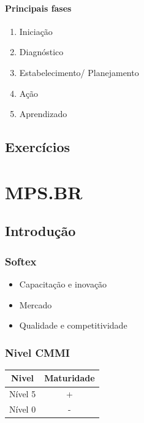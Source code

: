 \documentclass{article}
\begin{document}
\paragraph{Principais fases}
	\begin{enumerate}
	\item Iniciação
	\item Diagnóstico
	\item Estabelecimento/ Planejamento
	\item Ação
	\item Aprendizado	
	\end{enumerate}

\subsection{Exercícios}

\section{MPS.BR} 
\subsection{Introdução} \date{26 de Março de 2014}


\subsubsection{Softex} 
	\begin{itemize}
	\item Capacitação e inovação
	\item Mercado
	\item Qualidade e competitividade
	\end{itemize}
	
\subsubsection{Nivel CMMI}
	
\begin{center}

\begin{tabular}{|c|c|}
\hline 
Nivel & Maturidade \\ 
\hline 
Nível 5 & + \\ 
\hline 
Nível 0 & - \\ 
\hline 
\end{tabular} 

\end{center}
\end{document}
